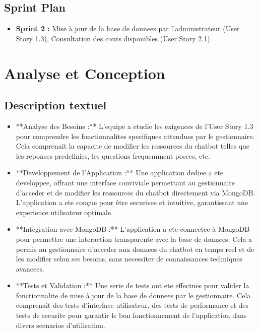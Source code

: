 \documentclass[a4paper, 11pt, openany]{report}
\begin{document}
\subsection{Sprint Plan}
\begin{itemize}
    \item \textbf{Sprint 2 :} Mise à jour de la base de donnees par l’administrateur (User Story 1.3), Consultation des cours disponibles (User Story 2.1)
\end{itemize}

\section{Analyse et Conception}
\subsection{Description textuel}
\begin{itemize}
    \item **Analyse des Besoins :** L'equipe a etudie les exigences de l'User Story 1.3 pour comprendre les fonctionnalites specifiques attendues par le gestionnaire. Cela comprenait la capacite de modifier les ressources du chatbot telles que les reponses predefinies, les questions frequemment posees, etc.
    
    \item **Developpement de l'Application :** Une application dediee a ete developpee, offrant une interface conviviale permettant au gestionnaire d'acceder et de modifier les ressources du chatbot directement via MongoDB. L'application a ete conçue pour être securisee et intuitive, garantissant une experience utilisateur optimale.
    
    \item **Integration avec MongoDB :** L'application a ete connectee à MongoDB pour permettre une interaction transparente avec la base de donnees. Cela a permis au gestionnaire d'acceder aux donnees du chatbot en temps reel et de les modifier selon ses besoins, sans necessiter de connaissances techniques avancees.
    
    \item **Tests et Validation :** Une serie de tests ont ete effectues pour valider la fonctionnalite de mise à jour de la base de donnees par le gestionnaire. Cela comprenait des tests d'interface utilisateur, des tests de performance et des tests de securite pour garantir le bon fonctionnement de l'application dans divers scenarios d'utilisation.
\end{itemize}
\end{document}
